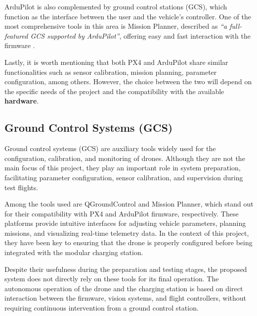 ArduPilot is also complemented by ground control stations (GCS), which function as the interface between the user and the vehicle's controller. One of the most comprehensive tools in this area is Mission Planner, described as \textit{“a full-featured GCS supported by ArduPilot”}, offering easy and fast interaction with the firmware \cite{ardupilot_docs}.

Lastly, it is worth mentioning that both PX4 and ArduPilot share similar functionalities such as sensor calibration, mission planning, parameter configuration, among others. However, the choice between the two will depend on the specific needs of the project and the compatibility with the available \textbf{hardware}.

\subsection{Ground Control Systems (GCS)}
Ground control systems (GCS) are auxiliary tools widely used for the configuration, calibration, and monitoring of drones. Although they are not the main focus of this project, they play an important role in system preparation, facilitating parameter configuration, sensor calibration, and supervision during test flights.

Among the tools used are QGroundControl and Mission Planner, which stand out for their compatibility with PX4 and ArduPilot firmware, respectively. These platforms provide intuitive interfaces for adjusting vehicle parameters, planning missions, and visualizing real-time telemetry data. In the context of this project, they have been key to ensuring that the drone is properly configured before being integrated with the modular charging station.

Despite their usefulness during the preparation and testing stages, the proposed system does not directly rely on these tools for its final operation. The autonomous operation of the drone and the charging station is based on direct interaction between the firmware, vision systems, and flight controllers, without requiring continuous intervention from a ground control station. \cite{qgc_docs}


